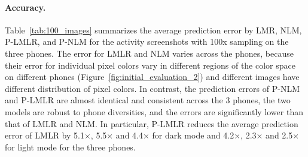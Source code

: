\paragraph{Accuracy.}
Table~\ref{tab:100_images}
summarizes the average prediction error by LMR, NLM, P-LMLR, and P-NLM
for the activity screenshots with 100x sampling on the three phones.
The error for LMLR and NLM varies across the phones,
because their error for individual pixel colors vary in different regions of the color space
on different phones (Figure~\ref{fig:initial_evaluation_2})
and different images have different distribution of pixel colors.
In contrast, the prediction errors of P-NLM and P-LMLR are
almost identical and consistent across the 3 phones,
\ie the two models are robust to phone diversities,
and the errors are significantly lower than that of LMLR and NLM.
In particular, P-LMLR reduces the average prediction error
of LMLR by
    5.1$\times$, 5.5$\times$ and 4.4$\times$ for dark mode
    and 4.2$\times$, 2.3$\times$ and 2.5$\times$ for light mode for the three phones.


